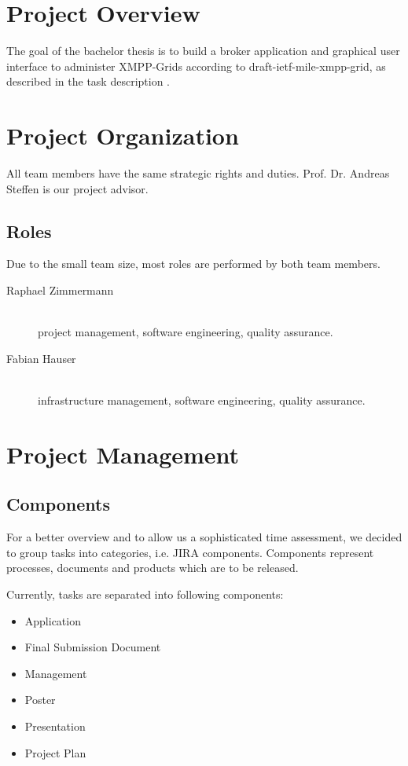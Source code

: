 \tableofcontents %


\mainmatter
\chapter{Project Overview}
The goal of the bachelor thesis is to build a broker application and graphical user interface to administer XMPP-Grids according to draft-ietf-mile-xmpp-grid, as described in the task description \cite{task-description}.


\chapter{Project Organization}
All team members have the same strategic rights and duties. Prof. Dr. Andreas Steffen is our project advisor.

\section{Roles}
Due to the small team size, most roles are performed by both team members.

\begin{description}
    \item[Raphael Zimmermann] \hfill \\
        project management, software engineering, quality assurance.
    \item[Fabian Hauser] \hfill \\
        infrastructure management, software engineering, quality assurance.
\end{description}

\chapter{Project Management}
\section{Components}
For a better overview and to allow us a sophisticated time assessment, we decided to group tasks into categories, i.e. JIRA components. Components represent processes, documents and products which are to be released.

Currently, tasks are separated into following components:

\begin{multicols}{2}
    \begin{itemize}
        \item Application
        \item Final Submission Document
        \item Management
        \item Poster
        \item Presentation
        \item Project Plan
    \end{itemize}
\end{multicols}

